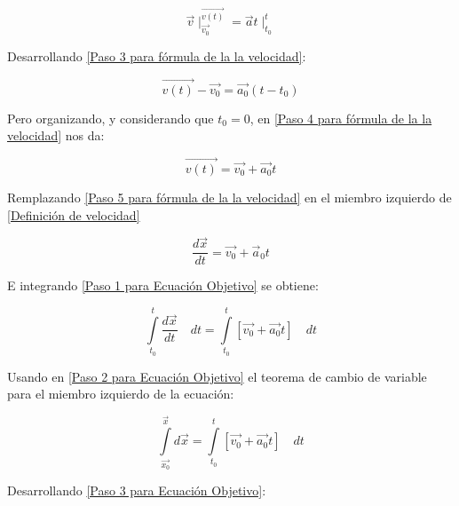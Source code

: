 \documentclass[12pt,letterpaper]{article}
\begin{document}
\begin{enumerate}
        \begin{equation}
            \label{Paso 3 para fórmula de la la velocidad}
            \vec{v}\mid_{\vec{v_{0}}}^{\vec{v(t)}}=\vec{a}t\mid_{t_{0}}^{t}
        \end{equation}
    
    Desarrollando \ref{Paso 3 para fórmula de la la velocidad}:
    
        \begin{equation}
            \label{Paso 4 para fórmula de la la velocidad}
            \vec{v(t)}-\vec{v_{0}}=\vec{a_{0}}(t-t_{0})
        \end{equation}

    Pero organizando, y considerando que $t_{0}=0$, en \ref{Paso 4 para fórmula de la la velocidad} nos da:

        \begin{equation}
            \label{Paso 5 para fórmula de la la velocidad}
            \vec{v(t)}=\vec{v_{0}}+\vec{a_{0}}t
        \end{equation}

    Remplazando \ref{Paso 5 para fórmula de la la velocidad} en el miembro izquierdo de \ref{Definición de velocidad}

        \begin{equation}
            \label{Paso 1 para Ecuación Objetivo}
            \frac{d\vec{x}}{dt}=\vec{v_{0}}+\vec{a}_{0}t
        \end{equation}

    E integrando \ref{Paso 1 para Ecuación Objetivo} se obtiene:

        \begin{equation}
            \label{Paso 2 para Ecuación Objetivo}
            \int \limits_{t_{0}}^{t} \frac{d\vec{x}}{dt}\quad dt
            =
            \int \limits_{t_{0}}^{t} [\vec{v_{0}}+\vec{a_{0}}t]\quad dt
        \end{equation}

    Usando en \ref{Paso 2 para Ecuación Objetivo} el teorema de cambio de variable para el miembro izquierdo de la ecuación:

        \begin{equation}
            \label{Paso 3 para Ecuación Objetivo}
            \int \limits_{\vec{x_{0}}}^{\vec{x}} d\vec{x}
            =
            \int \limits_{t_{0}}^{t} [\vec{v_{0}}+\vec{a_{0}}t]\quad dt
        \end{equation}

    Desarrollando \ref{Paso 3 para Ecuación Objetivo}:


\end{enumerate}
\end{document}
